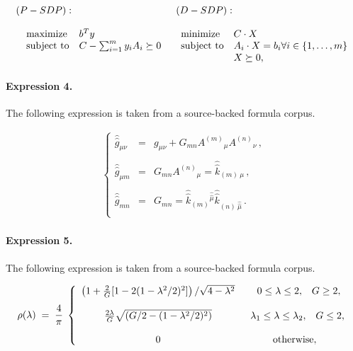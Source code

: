 \documentclass[11pt]{article}
\begin{document}
\begin{align*} \begin{array}{ll} (P-SDP): & (D-SDP): \\\;\; \begin{array}{lll}\text{\rm maximize} & b^Ty \\ \text{\rm subject to} & C - \sum^{m}_{i=1} y_i A_i \succeq 0 \end{array} &\begin{array}{lll} \\\text{\rm minimize} & C \cdot X \\ \text{\rm subject to} & A_i \cdot X = b_i \forall i \in \{1,\ldots,m\} \\& X \succeq 0,\end{array} \end{array}\end{align*}

\paragraph{Expression 4.} The following expression is taken from a source-backed formula corpus.

\begin{align*}\left\{\begin{array}{rcl}\hat{\hat{g}}_{\mu\nu} & = & g_{\mu\nu} +G_{mn} A^{(m)}{}_{\mu}A^{(n)}{}_{\nu}\, ,\\& & \\\hat{\hat{g}}_{\mu m} & = & G_{mn}A^{(n)}{}_{\mu} =\hat{\hat{k}}_{(m)\ \mu}\, ,\\& & \\\hat{\hat{g}}_{mn} & = & G_{mn} =\hat{\hat{k}}_{(m)}{}^{\hat{\hat{\mu}}}\hat{\hat{k}}_{(n)\ \hat{\hat{\mu}}}\, .\\\end{array}\right.\end{align*}

\paragraph{Expression 5.} The following expression is taken from a source-backed formula corpus.

\begin{align*}\rho(\lambda)\;=\;{4\over \pi}\;\left\{ \begin{array}{cc}\left(1 + {2\over G}[1-2(1-\lambda^2/2)^2]\right)/\sqrt{4-\lambda^2} & \;\;\;0\leq\lambda\leq 2,\;\;\; G \geq 2, \\ \\{2\lambda\over G}\sqrt{\left(G/2-(1-\lambda^2/2)^2\right)}& \;\;\lambda_1\leq\lambda\leq \lambda_2,\;\;\;G \leq 2, \\ \\0 & \hbox{otherwise},\end{array}\right.\end{align*}
\end{document}
